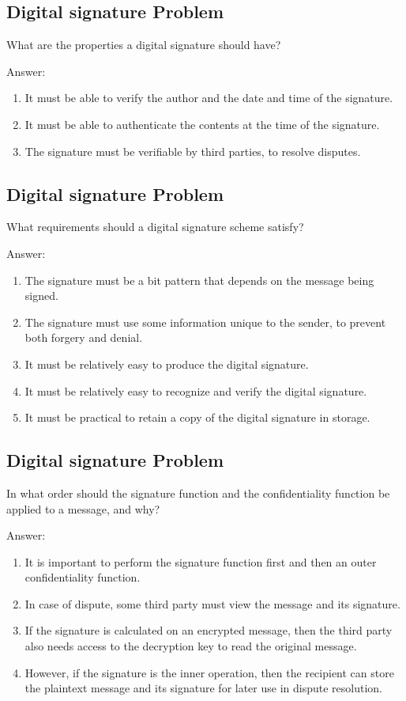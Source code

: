 \documentclass[paper=a4, fontsize=11pt]{scrartcl} %
\numberwithin{equation}{section} %
\numberwithin{figure}{section} %
\numberwithin{table}{section} %
\begin{document}
\subsection{Digital signature Problem \uppercase\expandafter{}}

What are the properties a digital signature should have?

Answer:
\begin{enumerate}
\item It must be able to verify the author and the date and time of the signature.
\item It must be able to authenticate the contents at the time of the signature.
\item The signature must be verifiable by third parties, to resolve disputes.
\end{enumerate}


\subsection{Digital signature Problem \uppercase\expandafter{}}

What requirements should a digital signature scheme satisfy?

Answer:
\begin{enumerate}
\item The signature must be a bit pattern that depends on the message being signed.
\item The signature must use some information unique to the sender, to prevent both forgery and denial.
\item It must be relatively easy to produce the digital signature.
\item It must be relatively easy to recognize and verify the digital signature.
\item It must be practical to retain a copy of the digital signature in storage.
\end{enumerate}


\subsection{Digital signature Problem \uppercase\expandafter{}}

In what order should the signature function and the confidentiality function be applied to a message, and why?

Answer:
\begin{enumerate}
\item It is important to perform the signature function first and then an outer confidentiality function.
\item In case of dispute, some third party must view the message and its signature.
\item If the signature is calculated on an encrypted message, then the third party also needs access to the decryption key to read the original message.
\item However, if the signature is the inner operation, then the recipient can store the plaintext message and its signature for later use in dispute resolution.
\end{enumerate}
\end{document}
